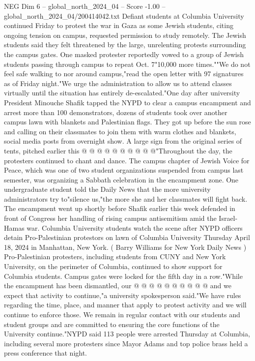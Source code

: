 \begin{textsample}{NEG Dim 6 – global\_north\_2024\_04 – Score -1.00 – global\_north\_2024\_04/200414042.txt}  \label{ex:f6_neg_338}
Defiant students at Columbia University continued Friday to protest the war in Gaza as some Jewish students, citing ongoing tension on campus, requested permission to study remotely.
The Jewish students said they felt threatened by the large, unrelenting protests surrounding the campus gates.
One masked protester reportedly vowed to a group of Jewish students passing through campus to repeat Oct. 7"10,000 more times.""We do not feel safe walking to nor around campus,"read the open letter with 97 signatures as of Friday night."We urge the administration to allow us to attend classes virtually until the situation has entirely de-escalated."One day after university President Minouche Shafik tapped the NYPD to clear a campus encampment and arrest more than 100 demonstrators, dozens of students took over another campus lawn with blankets and Palestinian flags.
They got up before the sun rose and calling on their classmates to join them with warm clothes and blankets, social media posts from overnight show.
A large sign from the original series of tents, pitched earlier this @ @ @ @ @ @ @ @ @ @"Throughout the day, the protesters continued to chant and dance.
The campus chapter of Jewish Voice for Peace, which was one of two student organizations suspended from campus last semester, was organizing a Sabbath celebration in the encampment zone.
One undergraduate student told the Daily News that the more university administrators try to"silence us,"the more she and her classmates will fight back.
The encampment went up shortly before Shafik earlier this week defended in front of Congress her handling of rising campus antisemitism amid the Israel-Hamas war.
Columbia University students watch the scene after NYPD officers detain Pro-Palestinian protestors on lawn of Columbia University Thursday April 18, 2024 in Manhattan, New York. ( Barry Williams for New York Daily News ) Pro-Palestinian protesters, including students from CUNY and New York University, on the perimeter of Columbia, continued to show support for Columbia students.
Campus gates were locked for the fifth day in a row."While the encampment has been dismantled, our @ @ @ @ @ @ @ @ @ @ and we expect that activity to continue,"a university spokesperson said."We have rules regarding the time, place, and manner that apply to protest activity and we will continue to enforce those.
We remain in regular contact with our students and student groups and are committed to ensuring the core functions of the University continue."NYPD said 113 people were arrested Thursday at Columbia, including several more protesters since Mayor Adams and top police brass held a press conference that night.

\end{textsample}
